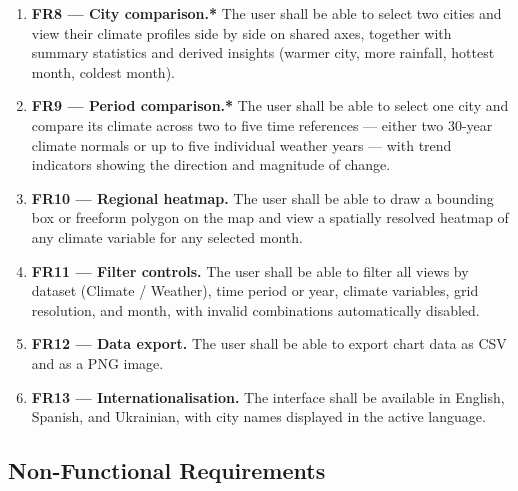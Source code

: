 \begin{enumerate}
  \item \textbf{FR8 --- City comparison.*} The user shall be able to select two
    cities and view their climate profiles side by side on shared axes, together
    with summary statistics and derived insights (warmer city, more rainfall,
    hottest month, coldest month).

  \item \textbf{FR9 --- Period comparison.*} The user shall be able to select
    one city and compare its climate across two to five time references ---
    either two 30-year climate normals or up to five individual weather years
    --- with trend indicators showing the direction and magnitude of change.

  \item \textbf{FR10 --- Regional heatmap.} The user shall be able to draw a
    bounding box or freeform polygon on the map and view a spatially resolved
    heatmap of any climate variable for any selected month.

  \item \textbf{FR11 --- Filter controls.} The user shall be able to filter all
    views by dataset (Climate / Weather), time period or year, climate variables,
    grid resolution, and month, with invalid combinations automatically disabled.

  \item \textbf{FR12 --- Data export.} The user shall be able to export chart
    data as CSV and as a PNG image.

  \item \textbf{FR13 --- Internationalisation.} The interface shall be available
    in English, Spanish, and Ukrainian, with city names displayed in the active
    language.
\end{enumerate}

\subsection{Non-Functional Requirements}\label{APP_REQ_NONFUNC}

